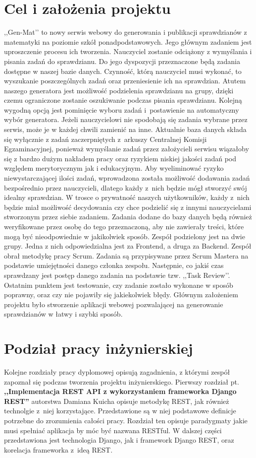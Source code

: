 \documentclass[oneside,polski,logo,indent]{amuthesis}
\begin{document}
\section{Cel i założenia projektu}

,,Gen-Mat’’ to nowy serwis webowy do generowania i publikacji sprawdzianów z matematyki na poziomie szkół ponadpodstawowych. Jego głównym zadaniem jest uproszczenie procesu ich tworzenia. Nauczyciel zostanie odciążony z wymyślania i pisania zadań do sprawdzianu. Do jego dyspozycji przeznaczone będą zadania dostępne w naszej bazie danych. Czynność, którą nauczyciel musi wykonać, to wyszukanie poszczególnych zadań oraz przeniesienie ich na sprawdzian.
Atutem naszego generatora jest możliwość podzielenia sprawdzianu na grupy, dzięki czemu ograniczone zostanie oszukiwanie podczas pisania sprawdzianu.
Kolejną wygodną opcją jest pominięcie wyboru zadań i~postawienie na automatyczny wybór generatora. Jeżeli nauczycielowi nie spodobają się zadania wybrane przez serwis, może je w każdej chwili zamienić na inne.
Aktualnie baza danych składa się wyłącznie z zadań zaczerpniętych z~arkuszy Centralnej Komisji Egzaminacyjnej, ponieważ wymyślanie zadań przez założycieli serwisu wiązałoby się z bardzo dużym nakładem pracy oraz ryzykiem niskiej jakości zadań pod względem merytorycznym jak i edukacyjnym.
Aby wyeliminować ryzyko niewystarczającej ilości zadań, wprowadzona została możliwość dodawania zadań bezpośrednio przez nauczycieli, dlatego każdy z~nich będzie mógł stworzyć swój idealny sprawdzian. W trosce o prywatność naszych użytkowników, każdy z~nich będzie miał możliwość decydowania czy chce podzielić się z innymi nauczycielami stworzonym przez siebie zadaniem. Zadania dodane do bazy danych będą również weryfikowane przez osobę do tego przeznaczoną, aby nie zawierały treści, które mogą być nieodpowiednie w jakikolwiek sposób.
Zespół podzielony jest na dwie grupy. Jedna z nich odpowiedzialna jest za Frontend, a druga za Backend. Zespół obrał metodykę pracy Scrum. Zadania są przypisywane przez Scrum Mastera na podstawie umiejętności danego członka zespołu. Następnie, co jakiś czas sprawdzany jest postęp danego zadania na podstawie tzw. ,,Task Review’’. Ostatnim punktem jest testowanie, czy zadanie zostało wykonane w sposób poprawny, oraz czy nie pojawiły się jakiekolwiek błędy.
Głównym założeniem projektu było stworzenie aplikacji webowej pozwalającej na generowanie sprawdzianów w łatwy i szybki sposób.

\section{Podział pracy inżynierskiej}
Kolejne rozdziały pracy dyplomowej opisują zagadnienia, z którymi zespół zapoznał się podczas tworzenia projektu inżynierskiego.
Pierwszy rozdział pt. \textbf{,,Implementacja REST API z wykorzystaniem frameworka Django REST''} autorstwa Damiana Kuicha opisuje metodykę REST, jak również technolgie z~niej korzystające. Przedstawione są w niej podstawowe definicje potrzebne do zrozumienia całości pracy. Rozdział ten opisuje paradygmaty jakie musi spełniać aplikacja by móc być nazwana RESTful. W dalszej części przedstawiona jest technologia Django, jak i framework Django REST, oraz korelacja frameworka z~ideą REST. 
\end{document}
